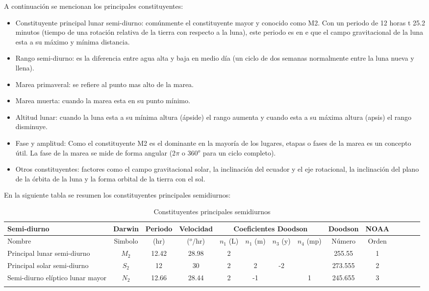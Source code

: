 \documentclass[12pt,letterpaper]{article}
\begin{document}
A continuación se mencionan los principales constituyentes\cite{a}:

\begin{itemize}
\item Constituyente principal lunar semi-diurno: comúnmente el constituyente mayor y conocido como M2. Con un periodo de 12 horas t 25.2 minutos (tiempo de una rotación relativa de la tierra con respecto a la luna), este periodo es en e que el campo gravitacional de la luna esta a su máximo y mínima distancia.
\item Rango semi-diurno: es la diferencia entre agua alta y baja en medio día (un ciclo de dos semanas normalmente entre la luna nueva y llena).
\item Marea primaveral: se refiere al punto mas alto de la marea.
\item Marea muerta: cuando la marea esta en su punto mínimo.
\item Altitud lunar: cuando la luna esta a su mínima altura (ápside) el rango aumenta y cuando esta a su máxima altura (apsis) el rango disminuye.
\item Fase y amplitud: Como el constituyente M2 es el dominante en la mayoría de los lugares, etapas o fases de la marea es un concepto útil. La fase de la marea se mide de forma angular (2$\pi$ o 360$^{o}$ para un ciclo completo).
\item Otros constituyentes: factores como el campo gravitacional solar, la inclinación del ecuador y el eje rotacional, la inclinación del plano de la órbita de la luna y la forma orbital de la tierra con el sol.
\end{itemize}

En la siguiente tabla se resumen los constituyentes principales semidiurnos\cite{a}:
\begin{center}
	\begin{longtable}{|p{2.7cm}|c|c|c|c|c|c|c|c|c|c|c|c|c}
  	\hline
Semi-diurno & Darwin & Periodo & Velocidad & \multicolumn{4}{c}{Coeficientes Doodson} & Doodson &  NOAA \\
\hline
Nombre & Simbolo & (hr) & ($^o$/hr) & $n_{1}$ (L) & $n_{1}$ (m) &	$n_{3}$ (y) &	$n_{4}$ (mp) & Número  & Orden\\
\hline
Principal lunar semi-diurno & $M_{2}$ & 	12.42 	& 28.98 &	2 & & & & 255.55 & 1\\
Principal solar semi-diurno & $S_{2}$ & 12 &	30 &	2 &	2 &	-2 & & 273.555 & 2 \\
Semi-diurno elíptico lunar mayor &
 	$N_{2}$ &	12.66 &	28.44 &	2 &	-1 & &		1 &	245.655 & 3 \\
    \hline
\caption{Constituyentes principales semidiurnos}  
\end{longtable}
\end{center}
\end{document}
